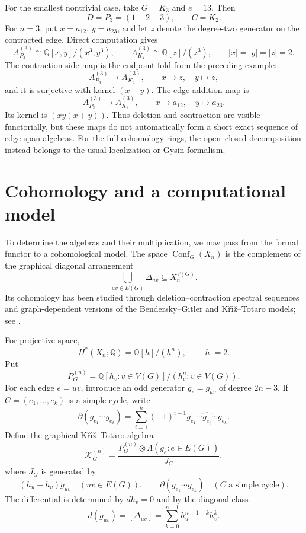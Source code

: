 \documentclass[11pt]{amsart}
\theoremstyle{plain}
\theoremstyle{definition}
\theoremstyle{remark}
\newcommand{\Q}{\mathbb{Q}}
\newcommand{\Conf}{\operatorname{Conf}}
\begin{document}
For the smallest nontrivial case, take $G=K_3$ and $e=13$.  Then
\[
  D=P_3=(1-2-3),
  \qquad
  C=K_2.
\]
For $n=3$, put $x=a_{12}$, $y=a_{23}$, and let $z$ denote the degree-two
generator on the contracted edge.  Direct computation gives
\[
  A_{P_3}^{(3)}\cong \Q[x,y]/(x^3,y^3),
  \qquad
  A_{K_2}^{(3)}\cong \Q[z]/(z^3),
  \qquad |x|=|y|=|z|=2.
\]
The contraction-side map is the endpoint fold from the preceding example:
\[
  A_{P_3}^{(3)}\longrightarrow A_{K_2}^{(3)},
  \qquad x\longmapsto z,\quad y\longmapsto z,
\]
and it is surjective with kernel $(x-y)$.  The edge-addition map is
\[
  A_{P_3}^{(3)}\longrightarrow A_{K_3}^{(3)},
  \qquad x\longmapsto a_{12},\quad y\longmapsto a_{23}.
\]
Its kernel is $(xy(x+y))$.  Thus deletion and contraction are visible
functorially, but these maps do not automatically form a short exact sequence
of edge-span algebras.  For the full cohomology rings, the open--closed
decomposition instead belongs to the usual localization or Gysin formalism.

\section{Cohomology and a computational model}

To determine the algebras and their multiplication, we now pass from the
formal functor to a cohomological model.  The space $\Conf_G(X_n)$ is the
complement of the graphical diagonal
arrangement
\[
  \bigcup_{uv\in E(G)}\Delta_{uv}\subseteq X_n^{V(G)}.
\]
Its cohomology has been studied through deletion--contraction spectral
sequences and graph-dependent versions of the Bendersky--Gitler and
K\v{r}{\'\i}\v{z}--Totaro models; see
\cite{Kriz,Totaro,EastwoodHuggett,BaranovskySazdanovic,BokstedtMinuz}.

For projective space,
\[
  H^*(X_n;\Q)=\Q[h]/(h^n),\qquad |h|=2.
\]
Put
\[
  P_G^{(n)}
  =\Q[h_v:v\in V(G)]/(h_v^n:v\in V(G)).
\]
For each edge $e=uv$, introduce an odd generator $g_e=g_{uv}$ of degree
$2n-3$.  If $C=(e_1,\ldots,e_k)$ is a simple cycle, write
\[
  \partial(g_{e_1}\cdots g_{e_k})
  =\sum_{i=1}^k(-1)^{i-1}
    g_{e_1}\cdots\widehat{g_{e_i}}\cdots g_{e_k}.
\]
Define the graphical K\v{r}{\'\i}\v{z}--Totaro algebra
\begin{equation}\label{eq:graphical-kriz-algebra}
  \mathcal K_G^{(n)}
  =\frac{P_G^{(n)}\otimes
    \Lambda(g_e:e\in E(G))}{J_G},
\end{equation}
where $J_G$ is generated by
\begin{equation}\label{eq:graphical-kriz-relations}
  (h_u-h_v)g_{uv}
  \quad(uv\in E(G)),
  \qquad
  \partial(g_{e_1}\cdots g_{e_k})
  \quad(C\text{ a simple cycle}).
\end{equation}
The differential is determined by $dh_v=0$ and by the diagonal class
\begin{equation}\label{eq:diagonal-differential}
  d(g_{uv})=[\Delta_{uv}]
  =\sum_{k=0}^{n-1}h_u^{n-1-k}h_v^k.
\end{equation}
\end{document}
